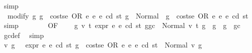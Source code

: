 \begin{isabellebody}
\ simp\isanewline
\ \ \ \ \ \ \isamarkupfalse%
\ \isamarkupfalse%
\ {\isacharasterisk}{\kern0pt}{\isacharasterisk}{\kern0pt}{\isacharcolon}{\kern0pt}\ {\isachardoublequoteopen}modify\ {\isacharparenleft}{\kern0pt}{\isasymlambda}g{\isachardot}{\kern0pt}\ g\ {\isacharminus}{\kern0pt}\ costs\isactrlsub e\ {\isacharparenleft}{\kern0pt}OR\ e{}\ e{}{\isacharparenright}{\kern0pt}\ e\ cd\ st{\isacharparenright}{\kern0pt}\ g\ {\isacharequal}{\kern0pt}\ Normal\ {\isacharparenleft}{\kern0pt}{\isacharparenleft}{\kern0pt}{\isacharparenright}{\kern0pt}{\isacharcomma}{\kern0pt}\ g\ {\isacharminus}{\kern0pt}\ costs\isactrlsub e\ {\isacharparenleft}{\kern0pt}OR\ e{}\ e{}{\isacharparenright}{\kern0pt}\ e\ cd\ st{\isacharparenright}{\kern0pt}{\isachardoublequoteclose}\ \isamarkupfalse%
\ simp\isanewline
\ \ \ \ \ \ \isamarkupfalse%
\ {}{}{\isacharparenleft}{\kern0pt}{}{\isacharparenright}{\kern0pt}{\isacharbrackleft}{\kern0pt}OF\ {\isacharasterisk}{\kern0pt}\ {\isacharasterisk}{\kern0pt}{\isacharasterisk}{\kern0pt}{\isacharbrackright}{\kern0pt}\ \isamarkupfalse%
\ {\isachardoublequoteopen}{\isasymAnd}g{}{\isacharprime}{\kern0pt}\ v{}\ t{}{\isachardot}{\kern0pt}\ expr\ e{}\ e\ cd\ st\ {\isacharparenleft}{\kern0pt}g{\isacharminus}{\kern0pt}gc{\isacharparenright}{\kern0pt}\ {\isacharequal}{\kern0pt}\ Normal\ {\isacharparenleft}{\kern0pt}{\isacharparenleft}{\kern0pt}v{}{\isacharcomma}{\kern0pt}\ t{}{\isacharparenright}{\kern0pt}{\isacharcomma}{\kern0pt}\ g{}{\isacharprime}{\kern0pt}{\isacharparenright}{\kern0pt}\ {\isasymLongrightarrow}\ g{}{\isacharprime}{\kern0pt}\ {\isasymle}\ g\ {\isacharminus}{\kern0pt}\ gc{\isachardoublequoteclose}\ \isamarkupfalse%
\ gc{\isacharunderscore}{\kern0pt}def\ \isamarkupfalse%
\ simp\isanewline
\ \ \ \ \ \ \isamarkupfalse%
\ \isamarkupfalse%
\ v\ g{\isacharprime}{\kern0pt}\ \ {\isacharasterisk}{\kern0pt}{\isacharasterisk}{\kern0pt}{\isacharasterisk}{\kern0pt}{\isacharcolon}{\kern0pt}\ {\isachardoublequoteopen}expr\ e{}\ e\ cd\ st\ {\isacharparenleft}{\kern0pt}g\ {\isacharminus}{\kern0pt}\ costs\isactrlsub e\ {\isacharparenleft}{\kern0pt}OR\ e{}\ e{}{\isacharparenright}{\kern0pt}\ e\ cd\ st{\isacharparenright}{\kern0pt}\ {\isacharequal}{\kern0pt}\ Normal\ {\isacharparenleft}{\kern0pt}v{\isacharcomma}{\kern0pt}\ g{\isacharprime}{\kern0pt}{\isacharparenright}{\kern0pt}{\isachardoublequoteclose}\ \isamarkupfalse%

\end{isabellebody}
